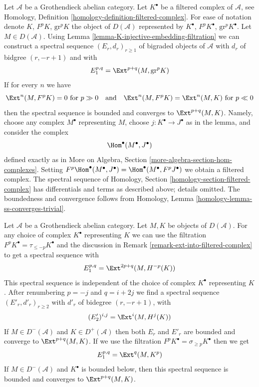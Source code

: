 \begin{remark}
\label{remark-ext-into-filtered-complex}
Let $\mathcal{A}$ be a Grothendieck abelian category.
Let $K^\bullet$ be a filtered complex of $\mathcal{A}$, see
Homology, Definition \ref{homology-definition-filtered-complex}.
For ease of notation denote $K$, $F^pK$, $\text{gr}^pK$ the
object of $D(\mathcal{A})$ represented by $K^\bullet$,
$F^pK^\bullet$, $\text{gr}^pK^\bullet$. Let $M \in D(\mathcal{A})$.
Using Lemma \ref{lemma-K-injective-embedding-filtration}
we can construct a spectral sequence $(E_r, d_r)_{r \geq 1}$
of bigraded objects of $\mathcal{A}$ with $d_r$ of bidgree
$(r, -r + 1)$ and
with
$$
E_1^{p, q} = \Ext^{p + q}(M, \text{gr}^pK)
$$
If for every $n$ we have
$$
\Ext^n(M, F^pK) = 0 \text{ for } p \gg 0
\quad\text{and}\quad
\Ext^n(M, F^pK) = \Ext^n(M, K) \text{ for } p \ll 0
$$
then the spectral sequence is bounded and converges to $\Ext^{p + q}(M, K)$.
Namely, choose any complex $M^\bullet$ representing $M$, choose
$j : K^\bullet \to J^\bullet$ as in the lemma, and consider the complex
$$
\Hom^\bullet(M^\bullet, J^\bullet)
$$
defined exactly as in
More on Algebra, Section \ref{more-algebra-section-hom-complexes}.
Setting $F^p\Hom^\bullet(M^\bullet, J^\bullet) =
\Hom^\bullet(M^\bullet, F^pJ^\bullet)$ we obtain a filtered complex.
The spectral sequence of
Homology, Section \ref{homology-section-filtered-complex}
has differentials and terms as described above; details omitted.
The boundedness and convergence follows from
Homology, Lemma \ref{homology-lemma-ss-converges-trivial}.
\end{remark}

\begin{remark}
\label{remark-spectral-sequences-ext}
Let $\mathcal{A}$ be a Grothendieck abelian category.
Let $M, K$ be objects of $D(\mathcal{A})$.
For any choice of complex $K^\bullet$ representing $K$ we
can use the filtration $F^pK^\bullet = \tau_{\leq -p}K^\bullet$
and the discussion in Remark \ref{remark-ext-into-filtered-complex}
to get a spectral sequence with
$$
E_1^{p, q} = \Ext^{2p + q}(M, H^{-p}(K))
$$
This spectral sequence is independent of the choice of
complex $K^\bullet$ representing $K$. After renumbering
$p = -j$ and $q = i + 2j$ we find a spectral sequence
$(E'_r, d'_r)_{r \geq 2}$ with $d'_r$ of bidegree $(r, -r + 1)$, with
$$
(E'_2)^{i, j} = \Ext^i(M, H^j(K))
$$
If $M \in D^-(\mathcal{A})$ and $K \in D^+(\mathcal{A})$ then
both $E_r$ and $E'_r$ are bounded and converge to $\Ext^{p + q}(M, K)$.
If we use the filtration $F^pK^\bullet = \sigma_{\geq p}K^\bullet$
then we get
$$
E_1^{p, q} = \Ext^q(M, K^p)
$$
If $M \in D^-(\mathcal{A})$ and $K^\bullet$ is bounded below, then
this spectral sequence is bounded and converges to $\Ext^{p + q}(M, K)$.
\end{remark}


